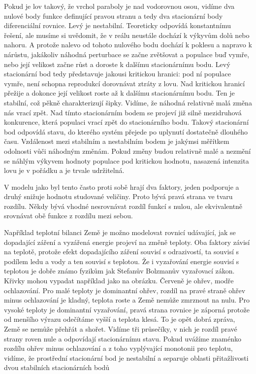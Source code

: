 \documentclass[12pt]{article}
\begin{document}
Pokud je lov takový, že vrchol paraboly je nad vodorovnou osou, vidíme dva nulové body funkce definující pravou stranu a tedy dva stacionární body diferenciální rovnice. Levý je nestabilní. Teoreticky odpovídá konstantnímu řešení, ale musíme si uvědomit, že v reálu neustále dochází k výkyvům dolů nebo nahoru. A protože nalevo od tohoto nulového bodu dochází k poklesu a napravo k nárůstu, jakákoliv náhodná perturbace se začne zvětšovat a populace buď vymře, nebo její velikost začne růst a doroste k dalšímu stacionárnímu bodu. Levý stacionární bod tedy představuje jakousi kritickou hranici: pod ní populace vymře, není schopna reprodukcí dorovnávat ztráty z lovu. Nad kritickou hranicí přežije a dokonce její velikost roste až k dalšímu stacionárnímu bodu. Ten je stabilní, což pěkně charakterizují šipky. Vidíme, že náhodná relativně malá změna nás vrací zpět. Nad tímto stacionárním bodem se projeví již silně mezidruhová konkurence, která populaci vrací zpět do stacionárního bodu. Takový stacionární bod odpovídá stavu, do kterého systém přejede po uplynutí dostatečně dlouhého času. Vzdálenost mezi stabilním a nestabilním bodem je jakýmsi měřítkem odolnosti vůči náhodným změnám. Pokud změny budou relativně malé a nezmění se náhlým výkyvem hodnoty populace pod kritickou hodnotu, nasazená intenzita lovu je v pořádku a je trvale udržitelná. 

V modelu jako byl tento často proti sobě hrají dva faktory, jeden podporuje a druhý snižuje hodnotu studované veličiny. Proto bývá pravá strana ve tvaru rozdílu. Někdy bývá vhodné nesrovnávat rozdíl funkcí s nulou, ale ekvivalentně srovnávat obě funkce z rozdílu mezi sebou. 

Například teplotní bilanci Země je možno modelovat rovnicí udávající, jak se dopadající záření a vyzářená energie projeví na změně teploty. Oba faktory závisí na teplotě, protože efekt dopadajícího záření souvisí s odrazivostí, ta souvisí s podílem ledu a vody a ten souvisí s teplotou. Že i vyzařování energie souvisí s teplotou je dobře známo fyzikům jak Stefanův Bolzmanův vyzařovací zákon. Křivky mohou vypadat například jako na obrázku. Červeně je ohřev, modře ochlazování. Pro malé teploty je dominantní ohřev, rozdíl na pravé straně ohřev minus ochlazování je kladný, teplota roste a Země nemůže zmrznout na nulu. Pro vysoké teploty je dominantní vyzařování, pravá strana rovnice je záporná protože od menšího výrazu odečítáme vyšší a teplota klesá. To je opět dobrá zpráva, Země se nemůže přehřát a shořet. Vidíme tři průsečíky, v nich je rozdíl pravé strany roven nule a odpovídají stacionárnímu stavu. Pokud uvážíme znaménko rozdílu ohřev minus ochlazování a z toho vyplývající monotonii pro teplotu, vidíme, že prostřední stacionární bod je nestabilní a separuje oblasti přitažlivosti dvou stabilních stacionárních bodů 
\end{document}
